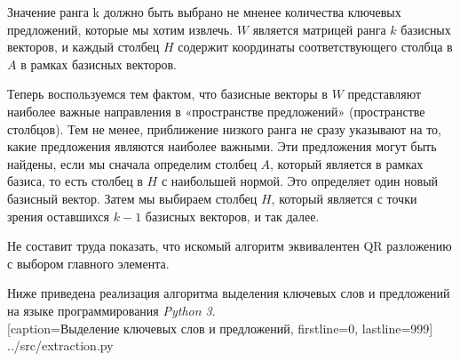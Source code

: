 Значение ранга k должно быть выбрано не мненее количества ключевых предложений, которые мы хотим извлечь.
$W$ является матрицей ранга $k$ базисных векторов,
и каждый столбец $H$ содержит координаты соответствующего столбца в $A$ в рамках базисных векторов.

Теперь воспользуемся тем фактом, что базисные векторы в $W$ представляют наиболее важные направления в «пространстве предложений» (пространстве столбцов).
Тем не менее, приближение низкого ранга не сразу указывают на то, какие предложения являются наиболее важными.
Эти предложения могут быть найдены, если мы сначала определим столбец $A$, который является  в рамках базиса,
то есть столбец в $H$ с наибольшей нормой. Это определяет один новый базисный вектор.
Затем мы выбираем столбец $H$, который является  с точки зрения оставшихся $k-1$ базисных векторов, и так далее.

Не составит труда показать, что искомый алгоритм эквивалентен QR разложению с выбором главного элемента.

\newpage

Ниже приведена реализация алгоритма выделения ключевых слов и предложений на языке программирования \textit{Python 3}.
\\


  [caption=Выделение ключевых слов и предложений, firstline=0, lastline=999]
  {../src/extraction.py}
